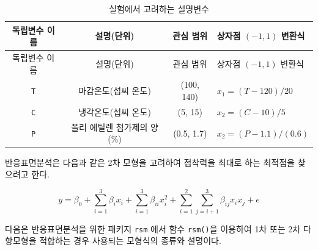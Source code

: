\documentclass[
]{book}
\theoremstyle{definition}
\theoremstyle{definition}
\theoremstyle{definition}
\theoremstyle{definition}
\theoremstyle{remark}
\begin{document}
\begin{longtable}[]{@{}cccl@{}}
\caption{실험에서 고려하는 설명변수}\tabularnewline
\toprule
독립변수 이름 & 설명(단위) & 관심 범위 & 상자점 \((-1,1)\) 변환식\tabularnewline
\midrule
\endfirsthead
\toprule
독립변수 이름 & 설명(단위) & 관심 범위 & 상자점 \((-1,1)\) 변환식\tabularnewline
\midrule
\endhead
\texttt{T} & 마감온도(섭씨 온도) & (100, 140) & \(x_1 = (T-120)/20\)\tabularnewline
\texttt{C} & 냉각온도(섭씨 온도) & (5, 15) & \(x_2 = (C-10)/5\)\tabularnewline
\texttt{P} & 폴리 에틸렌 첨가제의 양(\%) & (0.5, 1.7) & \(x_2 = (P-1.1)/(0.6)\)\tabularnewline
\bottomrule
\end{longtable}

반응표면분석은 다음과 같은 2차 모형을 고려하여 접착력을 최대로 하는 최적점을 찾으려고 한다.

\begin{equation}
y = \beta_0 + \sum_{i=1}^{3} \beta_i x_i + \sum_{i=1}^{3} \beta_{ii} x^2_i + 
\sum_{i=1}^{2} \sum_{j=i+1}^3 \beta_{ij} x_i x_j +e 
\label{eq:exammodel1}
\end{equation}

다음은 반응표면분석을 위한 패키지 \texttt{rsm} 에서 함수 \texttt{rsm()}을 이용하여 1차 또는 2차 다항모형을 적합하는 경우 사용되는 모형식의 종류와 설명이다.
\end{document}

